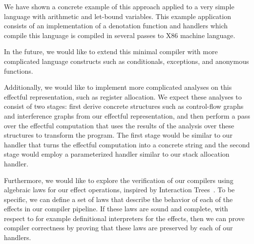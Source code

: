 \documentclass[a4paper,UKenglish,cleveref, autoref, thm-restate, anonymous]{oasics-v2021}
\begin{document}
We have shown a concrete example of this approach applied to a very simple language with arithmetic and let-bound variables.
This example application consists of an implementation of a denotation function and handlers which compile this language is compiled in several passes to X86 machine language.

In the future, we would like to extend this minimal compiler with more complicated language constructs such as conditionals, exceptions, and anonymous functions.

Additionally, we would like to implement more complicated analyses on this effectful representation, such as register allocation.
We expect these analyses to consist of two stages: first derive concrete structures such as control-flow graphs and interference graphs from our effectful representation, and then perform a pass over the effectful computation that uses the results of the analysis over these structures to transform the program.
The first stage would be similar to our handler that turns the effectful computation into a concrete string and the second stage would employ a parameterized handler similar to our stack allocation handler.

Furthermore, we would like to explore the verification of our compilers using algebraic laws for our effect operations, inspired by Interaction Trees~\cite{10.1145/3371119}.
To be specific, we can define a set of laws that describe the behavior of each of the effects in our compiler pipeline.
If these laws are sound and complete, with respect to for example definitional interpreters for the effects, then we can prove compiler correctness by proving that these laws are preserved by each of our handlers.





\end{document}
